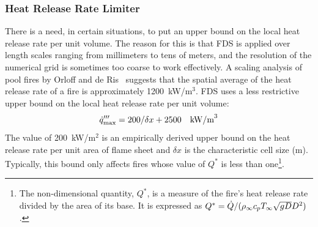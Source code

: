 \subsubsection{Heat Release Rate Limiter}

There is a need, in certain situations, to put an upper bound on the local heat release rate per unit volume. The reason for
this is that FDS is applied over length scales ranging from millimeters to tens of meters, and the resolution of the numerical grid
is sometimes too coarse to work effectively.
A scaling analysis of pool fires by Orloff and de Ris~\cite{Orloff:19th_Symposium} suggests that the spatial average of the
heat release rate of a fire is approximately 1200~kW/m$^3$. FDS uses a less restrictive upper bound on the local heat release rate per unit volume:
\begin{equation}\label{eq:q_bound} 
\dot{q}_{\max}''' = 200/\delta x + 2500 \quad \hbox{kW/m}^3 
\end{equation}
The value of 200~kW/m$^2$ is an empirically derived upper bound on the heat release rate per unit area of flame sheet and $\delta x$ is the characteristic cell size (m). Typically, this bound only affects fires whose value of $Q^*$ is less than one\footnote{The non-dimensional quantity, $Q^*$, is a measure of the fire's heat release rate divided by the area of its base. It is expressed as $Q^*=\dot{Q}/(\rho_\infty c_p T_\infty \sqrt{g D} D^2)$.}.

